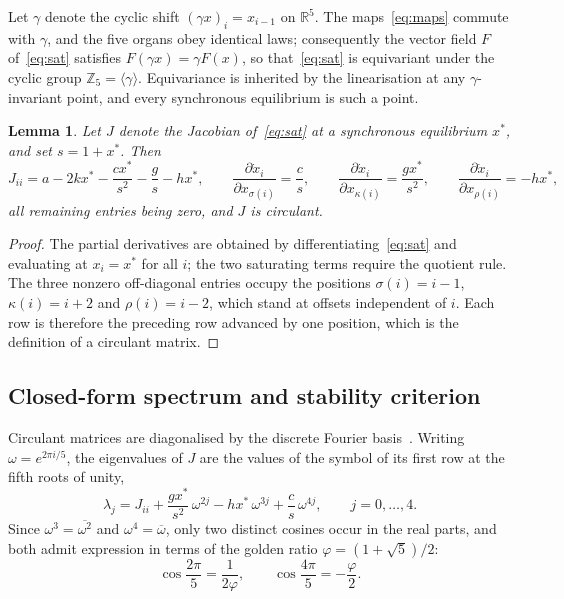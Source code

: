 \documentclass[11pt]{article}
\newcommand{\R}{{\mathbb{R}}}
\newcommand{\Z}{{\mathbb{Z}}}
\newtheorem{lemma}[theorem]{Lemma}
\theoremstyle{definition}
\theoremstyle{remark}
\begin{document}
	Let $\gamma$ denote the cyclic shift $(\gamma x)_i=x_{i-1}$ on $\R^5$. The
	maps~\eqref{eq:maps} commute with $\gamma$, and the five organs obey identical laws;
	consequently the vector field $F$ of~\eqref{eq:sat} satisfies
	$F(\gamma x)=\gamma F(x)$, so that~\eqref{eq:sat} is equivariant under the cyclic
	group $\Z_5=\langle\gamma\rangle$. Equivariance is inherited by the linearisation at
	any $\gamma$-invariant point, and every synchronous equilibrium is such a point.
	
	\begin{lemma}\label{lem:circulant}
		Let $J$ denote the Jacobian of~\eqref{eq:sat} at a synchronous equilibrium
		$x^\ast$, and set $s=1+x^\ast$. Then
		\[
		J_{ii}=a-2kx^\ast-\frac{cx^\ast}{s^{2}}-\frac{g}{s}-hx^\ast,
		\qquad
		\frac{\partial\dot x_i}{\partial x_{\sigma(i)}}=\frac{c}{s},
		\qquad
		\frac{\partial\dot x_i}{\partial x_{\kappa(i)}}=\frac{gx^\ast}{s^{2}},
		\qquad
		\frac{\partial\dot x_i}{\partial x_{\rho(i)}}=-hx^\ast,
		\]
		all remaining entries being zero, and $J$ is circulant.
	\end{lemma}
	
	\begin{proof}
		The partial derivatives are obtained by differentiating~\eqref{eq:sat} and
		evaluating at $x_i=x^\ast$ for all $i$; the two saturating terms require the
		quotient rule. The three nonzero off-diagonal entries occupy the positions
		$\sigma(i)=i-1$, $\kappa(i)=i+2$ and $\rho(i)=i-2$, which stand at offsets
		independent of $i$. Each row is therefore the preceding row advanced by one
		position, which is the definition of a circulant matrix.
	\end{proof}
	
	\subsection{Closed-form spectrum and stability criterion}
	
	Circulant matrices are diagonalised by the discrete Fourier basis~\cite{Davis1979}.
	Writing $\omega=e^{2\pi i/5}$, the eigenvalues of $J$ are the values of the symbol of
	its first row at the fifth roots of unity,
	\begin{equation}\label{eq:dft}
		\lambda_j=J_{ii}+\frac{gx^\ast}{s^{2}}\,\omega^{2j}-hx^\ast\,\omega^{3j}
		+\frac{c}{s}\,\omega^{4j},\qquad j=0,\dots,4 .
	\end{equation}
	Since $\omega^{3}=\overline{\omega^{2}}$ and $\omega^{4}=\overline{\omega}$, only two
	distinct cosines occur in the real parts, and both admit expression in terms of the
	golden ratio $\varphi=(1+\sqrt5)/2$:
	\[
	\cos\frac{2\pi}{5}=\frac{1}{2\varphi},\qquad
	\cos\frac{4\pi}{5}=-\frac{\varphi}{2} .
	\]
	
\end{document}

